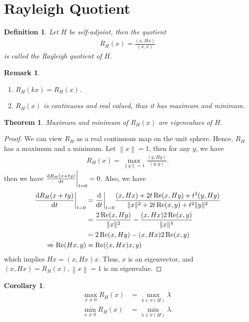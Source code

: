 \documentclass[11pt]{book}
\newtheorem{definition}{Definition}[chapter]
\newtheorem{theorem}{Theorem}[chapter]
\newtheorem{corollary}{Corollary}[theorem]
\newtheorem{remark}{Remark}[chapter]
\theoremstyle{definition}
\numberwithin{equation}{chapter}
\begin{document}
\medskip

\section{Rayleigh Quotient}

\begin{definition}
Let $H$ be self-adjoint, then the quotient
\begin{align*}
    R_H(x) = \frac{(x,Hx)}{(x,x)}
\end{align*}
is called the Rayleigh quotient of $H$.
\end{definition}

\begin{remark}
~\begin{enumerate}[label=(\arabic*)]
    \item $R_H(kx) = R_H(x)$.
    \item $R_H(x)$ is continuous and real valued, thus it has maximum and minimum.
\end{enumerate}
\end{remark}

\medskip

\begin{theorem}
Maximum and minimum of $R_H(x)$ are eigenvalues of $H$.
\end{theorem}
\begin{proof}
We can view $R_H$ as a real continuous map on the unit sphere. Hence, $R_H$ has a maximum and a minimum. Let $\left\|x\right\| =1$, then for any $y$, we have 
\begin{align*}
    R_H(x) = \max_{\|y\|=1} \frac{(y,Hy)}{(y,y)}.
\end{align*}
then we have $\dv{R_H(x+ty)}{t}\bigg|_{t = 0} = 0$. Also, we have
\begin{align*}
    \dv{R_H(x+ty)}{t}\bigg|_{t = 0} & = \dv{}{t}\bigg|_{t = 0} \frac{(x,Hx) + 2t\Re (x,Hy) + t^2 (y,Hy)}{\|x\|^2 + 2t \Re (x,y) + t^2 \|y\|^2} \\
    & = \frac{2\Re (x,Hy)}{\|x\|^2} - \frac{(x,Hx) 2 \Re (x,y)}{\|x\|^4} \\
    & = 2\Re (x,Hy) - (x,Hx) 2 \Re (x,y) \\
    \Rightarrow \Re (Hx,y) & =  \Re ((x,Hx)x,y)
\end{align*}
which implies $Hx = (x,Hx)x$. Thus, $x$ is an eigenvector, and $(x,Hx) = R_H(x), \left\|x\right\| = 1$ is an eigenvalue.
\end{proof}

\medskip

\begin{corollary}
\begin{align*}
    \max_{x\neq 0}R_H(x) & = \max_{\lambda\in \sigma(H)}\lambda \\
    \min_{x\neq 0}R_H(x) & = \min_{\lambda\in \sigma(H)}\lambda.
\end{align*}
\end{corollary}
\end{document}
